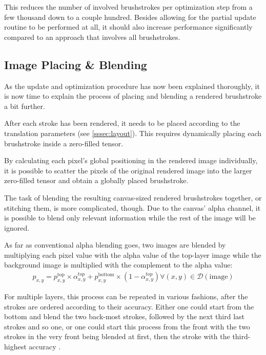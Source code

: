 This reduces the number of involved brushstrokes per optimization step from a few thousand down to a couple hundred.
Besides allowing for the partial update routine to be performed at all, it should also increase performance significantly compared to an approach that involves all brushstrokes.

\subsection[Placing \& Blending]{Image Placing \& Blending}
As the update and optimization procedure has now been explained thoroughly, it is now time to explain the process of placing and blending a rendered brushstroke a bit further.

After each stroke has been rendered, it needs to be placed according to the translation parameters (see \ref{sssec:layout}).
This requires dynamically placing each brushstroke inside a zero-filled tensor.

By calculating each pixel's global positioning in the rendered image individually, it is possible to scatter the pixels of the original rendered image into the larger zero-filled tensor and obtain a globally placed brushstroke.

The task of blending the resulting canvas-sized rendered brushstrokes together, or stitching them, is more complicated, though.
Due to the canvas' alpha channel, it is possible to blend only relevant information while the rest of the image will be ignored.

As far as conventional alpha blending goes, two images are blended by multiplying each pixel value with the alpha value of the top-layer image while the background image is multiplied with the complement to the alpha value:
\begin{align}
    p_{x,y} = p^{\text{top}}_{x, y} \times \alpha^{top}_{x, y}
    + p^{\text{bottom}}_{x, y} \times (1 - \alpha^{top}_{x, y})
    \forall (x, y) \in \mathcal{D}(\text{image})
\end{align}

For multiple layers, this process can be repeated in various fashions, after the strokes are ordered according to their accuracy.
Either one could start from the bottom and blend the two back-most strokes, followed by the next third last strokes and so one, or one could start this process from the front with the two strokes in the very front being blended at first, then the stroke with the third-highest accuracy \etc.

